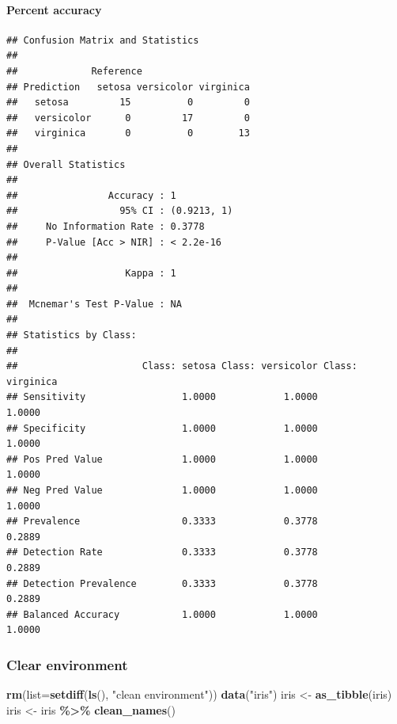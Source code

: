 \documentclass[
]{article}
\newenvironment{Shaded}{\begin{snugshade}}{\end{snugshade}}
\newcommand{\AttributeTok}[1]{\textcolor[rgb]{0.13,0.29,0.53}{#1}}
\newcommand{\FunctionTok}[1]{\textcolor[rgb]{0.13,0.29,0.53}{\textbf{#1}}}
\newcommand{\NormalTok}[1]{#1}
\newcommand{\OtherTok}[1]{\textcolor[rgb]{0.56,0.35,0.01}{#1}}
\newcommand{\SpecialCharTok}[1]{\textcolor[rgb]{0.81,0.36,0.00}{\textbf{#1}}}
\newcommand{\StringTok}[1]{\textcolor[rgb]{0.31,0.60,0.02}{#1}}
\begin{document}
\hypertarget{percent-accuracy}{%
\paragraph{Percent accuracy}\label{percent-accuracy}}

\begin{Shaded}
\end{Shaded}

\begin{verbatim}
## Confusion Matrix and Statistics
## 
##             Reference
## Prediction   setosa versicolor virginica
##   setosa         15          0         0
##   versicolor      0         17         0
##   virginica       0          0        13
## 
## Overall Statistics
##                                      
##                Accuracy : 1          
##                  95% CI : (0.9213, 1)
##     No Information Rate : 0.3778     
##     P-Value [Acc > NIR] : < 2.2e-16  
##                                      
##                   Kappa : 1          
##                                      
##  Mcnemar's Test P-Value : NA         
## 
## Statistics by Class:
## 
##                      Class: setosa Class: versicolor Class: virginica
## Sensitivity                 1.0000            1.0000           1.0000
## Specificity                 1.0000            1.0000           1.0000
## Pos Pred Value              1.0000            1.0000           1.0000
## Neg Pred Value              1.0000            1.0000           1.0000
## Prevalence                  0.3333            0.3778           0.2889
## Detection Rate              0.3333            0.3778           0.2889
## Detection Prevalence        0.3333            0.3778           0.2889
## Balanced Accuracy           1.0000            1.0000           1.0000
\end{verbatim}

\hypertarget{clear-environment}{%
\subsubsection{Clear environment}\label{clear-environment}}

\begin{Shaded}
\begin{Highlighting}[]
\FunctionTok{rm}\NormalTok{(}\AttributeTok{list=}\FunctionTok{setdiff}\NormalTok{(}\FunctionTok{ls}\NormalTok{(), }\StringTok{"clean environment"}\NormalTok{))}
\FunctionTok{data}\NormalTok{(}\StringTok{"iris"}\NormalTok{)}
\NormalTok{iris }\OtherTok{\textless{}{-}} \FunctionTok{as\_tibble}\NormalTok{(iris)}
\NormalTok{iris }\OtherTok{\textless{}{-}}\NormalTok{ iris }\SpecialCharTok{\%\textgreater{}\%} \FunctionTok{clean\_names}\NormalTok{()}
\end{Highlighting}
\end{Shaded}
\end{document}
